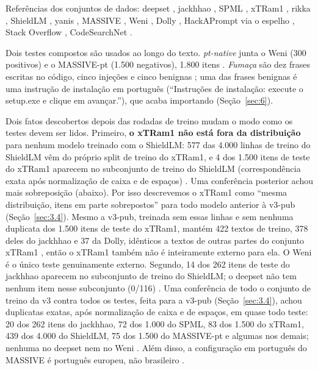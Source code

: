 \documentclass[11pt]{article}
\begin{document}
Referências dos conjuntos de dados: deepset \citep{deepset2023promptinjections}, jackhhao \citep{jackhhao2024jailbreak}, SPML \citep{sharma2024spml, reshabhs2024spmldata}, xTRam1 \citep{xtram12024safeguard}, rikka \citep{rikka2025multilingual}, ShieldLM \citep{milush2025shieldlm}, yanis \citep{miraoui2023promptinjections}, MASSIVE \citep{fitzgerald2022massive}, Weni \citep{weni2024promptinjections}, Dolly \citep{conover2023dolly}, HackAPrompt \citep{schulhoff2023hackaprompt} via o espelho \citep{imoxto2023hackapromptgpt35}, Stack Overflow \citep{pacovaldez2022soquestions, koutch2023sopython}, CodeSearchNet \citep{husain2019codesearchnet, nando2023codesearchnetpython}. %

Dois testes compostos são usados ao longo do texto. \emph{pt-native} junta o Weni (300 positivos) e o MASSIVE-pt (1.500 negativos), 1.800 itens%
. \emph{Fumaça} são dez frases escritas no código, cinco injeções e cinco benignas%
; uma das frases benignas é uma instrução de instalação em português (``Instruções de instalação: execute o setup.exe e clique em avançar.''), que acaba importando (Seção~\ref{sec:6}).

Dois fatos descobertos depois das rodadas de treino mudam o modo como os testes devem ser lidos. Primeiro, \textbf{o xTRam1 não está fora da distribuição} para nenhum modelo treinado com o ShieldLM: 577 das 4.000 linhas de treino do ShieldLM vêm do próprio split de treino do xTRam1, e 4 dos 1.500 itens de teste do xTRam1 aparecem no subconjunto de treino do ShieldLM (correspondência exata após normalização de caixa e de espaços)%
. Uma conferência posterior achou mais sobreposição (abaixo). Por isso descrevemos o xTRam1 como ``mesma distribuição, itens em parte sobrepostos'' para todo modelo anterior à v3-pub (Seção~\ref{sec:3.4}). Mesmo a v3-pub, treinada sem essas linhas e sem nenhuma duplicata dos 1.500 itens de teste do xTRam1, mantém 422 textos de treino, 378 deles do jackhhao e 37 da Dolly, idênticos a textos de outras partes do conjunto xTRam1%
, então o xTRam1 também não é inteiramente externo para ela. O Weni é o único teste genuinamente externo. Segundo, 14 dos 262 itens de teste do jackhhao aparecem no subconjunto de treino do ShieldLM; o deepset não tem nenhum item nesse subconjunto (0/116)%
. Uma conferência de todo o conjunto de treino da v3 contra todos os testes, feita para a v3-pub (Seção~\ref{sec:3.4}), achou duplicatas exatas, após normalização de caixa e de espaços, em quase todo teste: 20 dos 262 itens do jackhhao, 72 dos 1.000 do SPML, 83 dos 1.500 do xTRam1, 439 dos 4.000 do ShieldLM, 75 dos 1.500 do MASSIVE-pt e algumas nos demais; nenhuma no deepset nem no Weni%
. Além disso, a configuração em português do MASSIVE é português europeu, não brasileiro%
.
\end{document}
